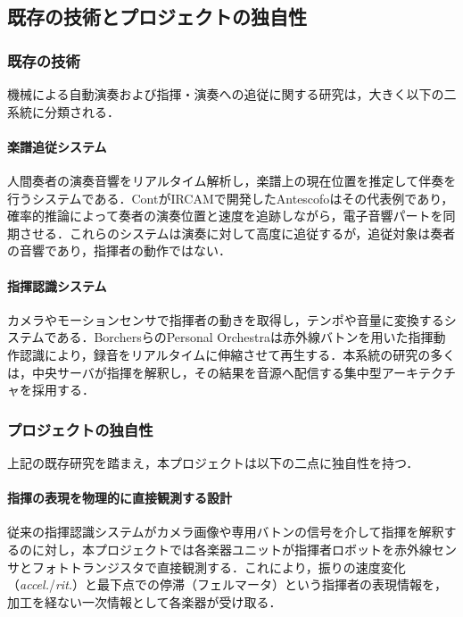 \documentclass[lualatex,book,paper=a4paper,jafontsize=11.5pt,jafontscale=1.05,oneside]{jlreq}
\begin{document}
\subsection{既存の技術とプロジェクトの独自性}

\subsubsection{既存の技術}

機械による自動演奏および指揮・演奏への追従に関する研究は，大きく以下の二系統に分類される．

\paragraph{楽譜追従システム}
人間奏者の演奏音響をリアルタイム解析し，楽譜上の現在位置を推定して伴奏を行うシステムである．ContがIRCAMで開発したAntescofo\cite{cont2008antescofo}はその代表例であり，確率的推論によって奏者の演奏位置と速度を追跡しながら，電子音響パートを同期させる．これらのシステムは演奏に対して高度に追従するが，追従対象は奏者の音響であり，指揮者の動作ではない．

\paragraph{指揮認識システム}
カメラやモーションセンサで指揮者の動きを取得し，テンポや音量に変換するシステムである．BorchersらのPersonal Orchestra\cite{borchers2004personal}は赤外線バトンを用いた指揮動作認識により，録音をリアルタイムに伸縮させて再生する．本系統の研究の多くは，中央サーバが指揮を解釈し，その結果を音源へ配信する集中型アーキテクチャを採用する．

\subsubsection{プロジェクトの独自性}

上記の既存研究を踏まえ，本プロジェクトは以下の二点に独自性を持つ．

\paragraph{指揮の表現を物理的に直接観測する設計}
従来の指揮認識システムがカメラ画像や専用バトンの信号を介して指揮を解釈するのに対し，本プロジェクトでは各楽器ユニットが指揮者ロボットを赤外線センサとフォトトランジスタで直接観測する．これにより，振りの速度変化（\textit{accel.}/\textit{rit.}）と最下点での停滞（フェルマータ）という指揮者の表現情報を，加工を経ない一次情報として各楽器が受け取る．
\end{document}
